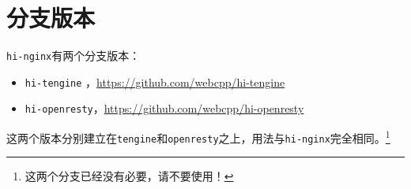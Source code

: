 \section{分支版本}
\texttt{hi-nginx}有两个分支版本：
\begin{itemize}
\item \texttt{hi-tengine} ，\url{https://github.com/webcpp/hi-tengine}
\item \texttt{hi-openresty}，\url{https://github.com/webcpp/hi-openresty}
\end{itemize}
这两个版本分别建立在\texttt{tengine}和\texttt{openresty}之上，用法与\texttt{hi-nginx}完全相同。\footnote{这两个分支已经没有必要，请不要使用！}
